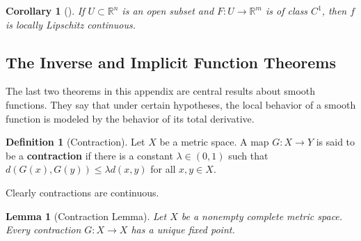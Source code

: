 \documentclass[reqno]{amsart}
\theoremstyle{plain}%
\newtheorem{lemma}[theorem]{Lemma}
\newtheorem{corollary}[theorem]{Corollary}
\theoremstyle{definition}
\newtheorem{definition}[theorem]{Definition}
\theoremstyle{remark}
\begin{document}
        \begin{corollary}[]
        If $U \subset \mathbb{R}^{n}$ is an open subset and $F  \colon U \to 
        \mathbb{R}^{m}$ is of class $C^{1}$, then $f$ is locally
        Lipschitz continuous.
        \end{corollary}

    \subsection*{The Inverse and Implicit Function Theorems}
        The last two theorems in this appendix are central results about smooth
        functions. They say that under certain hypotheses, the local behavior of
        a smooth function is modeled by the behavior of its total derivative.

        \begin{definition}[Contraction]
        Let $X$ be a metric space. A map $G  \colon X \to Y$ is said to be
        a \textbf{contraction} if there is a constant $\lambda \in \left( 0,1 \right) $ 
        such that $d\left( G(x),G(y) \right) \le \lambda d(x,y)$ for all
        $x,y \in X$. 
        \end{definition}
        Clearly contractions are continuous.

        \begin{lemma}[Contraction Lemma]
        Let $X$ be a nonempty complete metric space. Every contraction $G
         \colon X \to X$ has a unique fixed point.
        \end{lemma}
\end{document}
